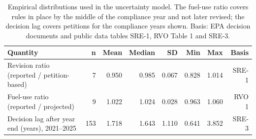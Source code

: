\begin{table}[htbp]
\centering
\caption{Empirical distributions used in the uncertainty model. The fuel-use ratio covers rules in place by the middle of the compliance year and not later revised; the decision lag covers petitions for the compliance years shown. Basis: EPA decision documents and public data tables SRE-1, RVO Table 1 and SRE-3.}
\label{tab:uncertainty}
\footnotesize\setlength{\tabcolsep}{4pt}
\begin{tabular}{lrrrrrrr}
\toprule
Quantity & n & Mean & Median & SD & Min & Max & Basis \\
\midrule
Revision ratio (reported / petition-based) & 7 & 0.950 & 0.985 & 0.067 & 0.828 & 1.014 & SRE-1 \\
Fuel-use ratio (reported / projected) & 9 & 1.022 & 1.024 & 0.028 & 0.963 & 1.060 & RVO 1 \\
Decision lag after year end (years), 2021--2025 & 153 & 1.718 & 1.643 & 1.110 & 0.641 & 3.852 & SRE-3 \\
\bottomrule
\end{tabular}
\end{table}
